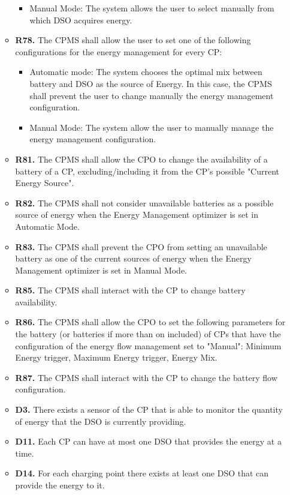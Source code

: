 \documentclass{Configuration_Files/PoliMi3i_thesis}
\begin{document}
\begin{enumerate}[label=\textbf{G\arabic*}]
\begin{itemize}
\begin{itemize}
                    \item Manual Mode: The system allows the user to select manually from which DSO acquires energy.
                \end{itemize}
            \item \textbf{R78.} The CPMS shall allow the user to set one of the following configurations for the energy management for every CP:
                \begin{itemize}
                    \item Automatic mode: The system chooses the optimal mix between battery and DSO as the source of Energy. In this case, the CPMS shall prevent the user to change manually the energy management configuration.
                    \item Manual Mode: The system allow the user to manually  manage the energy management configuration.
                \end{itemize}
            \item \textbf{R81.} The CPMS shall allow the CPO to change the availability of a battery of a CP, excluding/including it from the CP's possible "Current Energy Source".
            \item \textbf{R82.} The CPMS shall not consider unavailable batteries as  a possible source of energy when the Energy Management optimizer is set in Automatic Mode.
            \item \textbf{R83.} The CPMS shall prevent the CPO from setting an unavailable battery as one of the current sources of energy when the Energy Management optimizer is set in Manual Mode.
            \item \textbf{R85.} The CPMS shall interact with the CP to change battery availability.
            \item \textbf{R86.} The CPMS shall allow the CPO to set the following  parameters for the battery (or batteries if more than on included) of CPs that have the configuration of the energy flow management set to  "Manual": Minimum Energy trigger, Maximum Energy trigger, Energy Mix.
            \item \textbf{R87.} The CPMS shall interact with the CP to change the battery flow configuration.
            \item \textbf{D3.} There exists a sensor of the CP that is able to monitor the quantity of energy that the DSO is currently providing.
            \item \textbf{D11.} Each CP can have at most one DSO that provides the energy at a time.
            \item \textbf{D14.} For each charging point there exists at least one DSO that can provide the energy to it.
        \end{itemize}


\end{enumerate}
\end{document}
